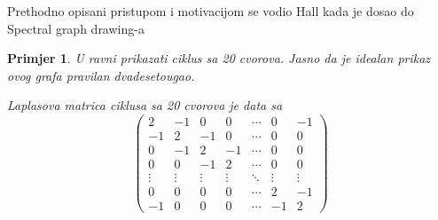 \documentclass[11pt]{article}
\newtheorem{example}{Primjer}
\begin{document}
    Prethodno opisani pristupom i motivacijom se vodio Hall kada je dosao do Spectral graph drawing-a

	\begin{example}
		U ravni prikazati ciklus sa 20 cvorova. Jasno da je idealan prikaz ovog grafa pravilan dvadesetougao.
        
		Laplasova matrica ciklusa sa 20 cvorova je data sa
		\[
			\begin{pmatrix}
				2 & -1 & 0 & 0 & \cdots & 0 & -1 \\
				-1 & 2 & -1 & 0 & \cdots & 0 & 0 \\
				0 & -1 & 2 & -1 & \cdots & 0 & 0 \\
				0 & 0 & -1 & 2 & \cdots & 0 & 0 \\
				\vdots & \vdots & \vdots & \vdots & \ddots & \vdots & \vdots \\
				0 & 0 & 0 & 0 & \cdots & 2 & -1 \\
				-1 & 0 & 0 & 0 & \cdots & -1 & 2
            \end{pmatrix}	
            \]
            

\end{example}
\end{document}
